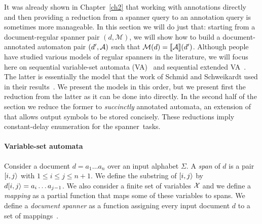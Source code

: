 
It was already shown in Chapter~\ref{ch2} that working with annotations directly and then providing a reduction from a spanner query to an annotation query is sometimes more manageable. In this section we will do just that: starting from a document-regular spanner pair $(d, \mathcal{M})$, we will show how to build a document-annotated automaton pair $(d', \mathcal{A})$ such that $\mathcal{M}(d) = {\llbracket{\mathcal{A}}\rrbracket}(d')$. Although people have studied various models of regular spanners in the literature, we will focus here on sequential variable-set automata (VA)~\cite{FaginKRV15} and sequential extended VA~\cite{FlorenzanoRUVV20}. The latter is essentially the model that the work of Schmid and Schweikardt used in their results~\cite{SchmidS21}. We present the models in this order, but we present first the reduction from the latter as it can be done into \rt directly.
In the second half of the section we reduce the former to {\it succinctly} annotated automata, an extension of \rt that allows output symbols to be stored concisely. 
These reductions imply constant-delay enumeration for the spanner~tasks.

\paragraph{Variable-set automata} 
Consider a document $d = a_1\ldots a_n$ over an input alphabet $\Sigma$. A {\it span} of $d$ is a pair $[i,j\rangle$ with $1 \leq i \leq j \leq n+1$. We define the substring of $[i,j\rangle$ by $d[i,j\rangle = a_i \ldots a_{j-1}$. We also consider a finite set of variables $\mathcal{X}$ and we define a {\it mapping} as a partial function that maps some of these variables to spans. We define a {\it document spanner} as a function assigning every input document $d$ to a set of mappings~\cite{FaginKRV15}.

